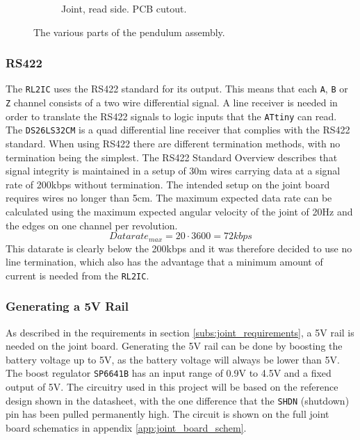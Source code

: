 \begin{figure}[H]
\begin{minipage}{.4\linewidth}
\begin{subfigure}[b]{\linewidth}
			\caption{Joint, read side. PCB cutout.}
			\label{sfig:readside_2}
		\end{subfigure}
	\end{minipage}
	\caption{The various parts of the pendulum assembly.}
	\label{fig:mechdesign}
\end{figure}

\subsubsection{RS422}
The \texttt{RL2IC} uses the RS422 standard for its output.
This means that each \texttt{A}, \texttt{B} or \texttt{Z} channel consists of a two wire differential signal.
A line receiver is needed in order to translate the RS422 signals to logic inputs that the \texttt{ATtiny} can read.
The \texttt{DS26LS32CM} is a quad differential line receiver that complies with the RS422 standard.  
When using RS422 there are different termination methods, with no termination being the simplest.
The RS422 Standard Overview \cite{rs422_texas} describes that signal integrity is maintained in a setup of \approx 30m wires carrying data at a signal rate of 200kbps without termination.
The intended setup on the joint board requires wires no longer than 5cm.
The maximum expected data rate can be calculated using the maximum expected angular velocity of the joint of 20Hz and the edges on one channel per revolution.
\begin{equation}
Datarate_{max}	= 20 \cdot 3600 = 72kbps
\end{equation}
This datarate is clearly below the 200kbps and it was therefore decided to use no line termination, which also has the advantage that a minimum amount of current is needed from the \texttt{RL2IC}.


\subsubsection{Generating a 5V Rail}
As described in the requirements in section \ref{subs:joint_requirements}, a 5V rail is needed on the joint board.
Generating the 5V rail can be done by boosting the battery voltage up to 5V, as the battery voltage will always be lower than 5V.
The boost regulator \texttt{SP6641B} \cite{sp6641b} has an input range of 0.9V to 4.5V and a fixed output of 5V.
The circuitry used in this project will be based on the reference design shown in the datasheet, with the one difference that the \texttt{SHDN} (shutdown) pin has been pulled permanently high.
The circuit is shown on the full joint board schematics in appendix \ref{app:joint_board_schem}.

